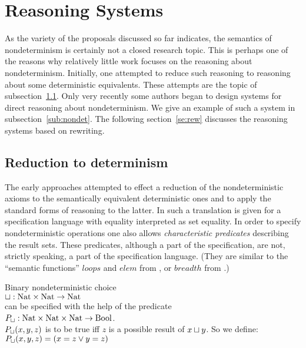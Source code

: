 {\section{Reasoning Systems}\label{se:reasoning}
As the variety of the proposals discussed so far indicates, the semantics of nondeterminism is certainly not 
a closed research topic. This is perhaps one of the reasons why relatively little work focuses on the 
reasoning about nondeterminism. Initially, one attempted to reduce such reasoning to reasoning about 
some deterministic equivalents. These attempts are the topic of 
subsection~\ref{sub:red}. Only very recently some authors 
began to design systems for direct reasoning about nondeterminism. We give an example of such a system 
in subsection~\ref{sub:nondet}. The following section~\ref{se:rew} discusses the reasoning systems based on rewriting.

\subsection{Reduction to determinism}\label{sub:red}
The early approaches attempted to effect a reduction of the nondeterministic axioms to the semantically 
equivalent deterministic ones and to apply the standard forms of reasoning to the latter. In 
\cite{c:121} such a 
translation is given for a specification language with equality interpreted as set equality. In order to specify 
nondeterministic operations one also allows {\em characteristic 
predicates} describing the result sets. These 
predicates, although a part of the specification, are not, strictly speaking, a part of the specification 
language. (They are similar to the ``semantic functions'' $loops$ and 
$elem$ from \cite{c:21}, or $breadth$ from \cite{c:18}.)
\begin{Example}\label{ex:61} 
Binary nondeterministic choice \\[1ex]
\hspace*{2em}	$\sqcup: {\rm{Nat}}\times {\rm{Nat}}\mathrel{\rightarrow} {\rm{Nat}}$  \\[1ex]
can be specified with the help of the predicate \\[1ex]
\hspace*{2em}
	$P_{\sqcup} : {\rm{Nat}}\times{\rm{Nat}}\times{\rm{Nat}}\mathrel{\rightarrow}{\rm{Bool}}$. \\[1ex]
$P_{\sqcup}(x,y,z)$ is to be true iff $z$ is a possible result 
of $x\sqcup y$. So we define: \\[1ex]
\hspace*{2em}	$P_{\sqcup}(x,y,z)  =  (x=z\lor y=z)$
\end{Example}

}
